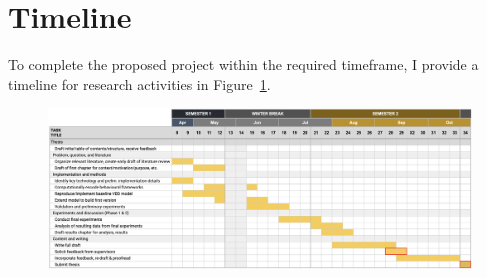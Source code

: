 \section{Timeline}

To complete the proposed project within the required timeframe, I provide a timeline for research activities in Figure~\ref{fig:timeline}.

\begin{figure}[h]
\centering
\includegraphics[scale=0.45,angle=90,origin=c]{figures/research_timeline.png}
\label{fig:timeline}
\end{figure}